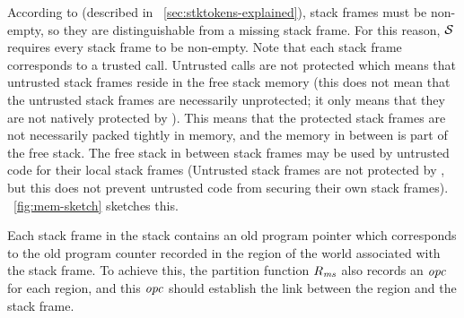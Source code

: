\begin{jversion}
According to \stktokens{} (described in \sectionname~\ref{sec:stktokens-explained}), stack frames must be non-empty, so they are distinguishable from a missing stack frame.
For this reason, $\lrstk[]$ requires every stack frame to be non-empty.
Note that each stack frame corresponds to a trusted call.
Untrusted calls are not protected which means that untrusted stack frames reside in the free stack memory (this does not mean that the untrusted stack frames are necessarily unprotected; it only means that they are not natively protected by \stktokens{}).
This means that the protected stack frames are not necessarily packed tightly in memory, and the memory in between is part of the free stack.
The free stack in between stack frames may be used by untrusted code for their local stack frames (Untrusted stack frames are not protected by \srccm{}, but this does not prevent untrusted code from securing their own stack frames).
\figurename~\ref{fig:mem-sketch} sketches this.

Each stack frame in the \srccm{} stack contains an old program pointer which corresponds to the old program counter recorded in the region of the world associated with the stack frame.
To achieve this, the partition function $R_\ms$ also records an $\opc$ for each region, and this $\opc$ should establish the link between the region and the stack frame.
\begin{figure}
  \centering
\end{figure}
\end{jversion}
